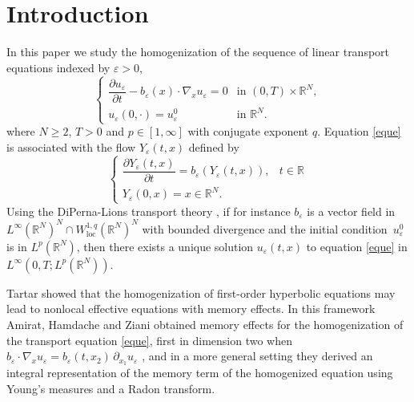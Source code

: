 \documentclass[JEP,XML,SOM,Unicode]{cedram}
\newcommand{\loc}{\mathrm{loc}}
\def \RR {\mathbb R}
\theoremstyle{plain}
\theoremstyle{definition}
\begin{document}
\section{Introduction}
In this paper we study the homogenization of the sequence of linear transport equations indexed by $\varepsilon>0$,
\begin{equation}\label{eque}
\begin{cases}
\dfrac{\partial u_\varepsilon}{\partial t}-b_\varepsilon(x)\cdot\nabla_x u_\varepsilon=0 & \mbox{in }(0,T)\times\RR^N,
\\[5pt]
u_\varepsilon(0,\cdot)=u_\varepsilon^0 & \mbox{in }\RR^N.
\end{cases}
\end{equation}
where $N\geq 2$, $T>0$ and $p\in[1,\infty]$ with conjugate exponent $q$.
Equation \eqref{eque} is associated with the flow $Y_\varepsilon(t,x)$ defined by
\begin{equation}\label{Yebei}
\begin{cases}
\dfrac{\partial Y_\varepsilon(t,x)}{\partial t}=b_\varepsilon(Y_\varepsilon(t,x)), & t\in\RR
\\[5pt]
Y_\varepsilon(0,x)=x\in\RR^N.
\end{cases}
\end{equation}
Using the DiPerna-Lions transport theory \cite[Cor.\,II.1]{DiLi}, if for instance $b_\varepsilon$ is a vector field in $L^\infty(\RR^N)^N\cap W^{1,q}_\loc(\RR^N)^N$ with bounded divergence and the initial condition~$u_\varepsilon^0$ is in $L^p(\RR^N)$, then there exists a unique solution $u_\varepsilon(t,x)$ to equation \eqref{eque} in $L^\infty(0,T;L^p(\RR^N))$.

Tartar \cite{Tar} showed that the homogenization of first-order hyperbolic equations may lead to nonlocal effective equations with memory effects.
In this framework Amirat, Hamdache and Ziani obtained memory effects for the homogenization of the transport equation \eqref{eque}, first in dimension two when $b_\varepsilon\cdot\nabla_x u_\varepsilon=b_\varepsilon(t,x_2)\,\partial_{x_1}u_\varepsilon$ \cite{AHZ1}, and in a more general setting \cite{AHZ2,AHZ3} they derived an integral representation of the memory term of the homogenized equation using Young's measures and a Radon transform.
\end{document}
